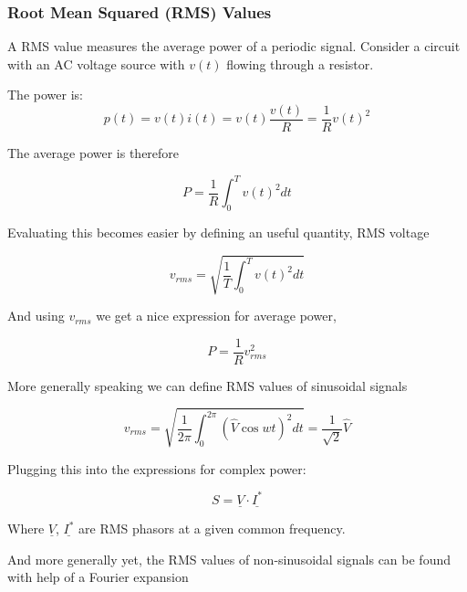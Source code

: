 \documentclass[../notes.tex]{subfiles}
\begin{document}
\subsubsection{Root Mean Squared (RMS) Values}


A RMS value measures the average power of a periodic signal. Consider a circuit with an AC voltage source with $ v(t) $ flowing through a resistor. 


The power is:
\begin{equation}
	p(t) = v(t) i(t) = v(t) \frac{v(t)}{R} = \frac{1}{R} v(t)^2
\end{equation}

The average power is therefore

\begin{equation}
	P = \frac{1}{R} \int_0^T v(t)^2 dt
\end{equation}


Evaluating this becomes easier by defining an useful quantity, RMS voltage

\begin{equation}
	v_{rms} = \sqrt{\frac{1}{T} \int^T_0 v(t)^2 dt} 
\end{equation}
	

And using $ v_{rms} $ we get a nice expression for average power,

\begin{equation}
	P = \frac{1}{R} v_{rms}^2
\end{equation}



More generally speaking we can define RMS values of sinusoidal signals

\begin{definition}
	\begin{equation}
		v_{rms} = \sqrt{\frac{1}{2\pi} \int^{2\pi}_0 (\hat{V} \cos wt )^2 dt}  = \frac{1}{\sqrt{2}}  \hat{V}
	\end{equation}
\end{definition}


Plugging this into the expressions for complex power:

\begin{equation}
	S = \underline{V} \cdot \underline{I^*}
\end{equation}

Where $ \underline{V} $, $ \underline{I^*} $ are RMS phasors at a given common frequency.


And more generally yet, the RMS values of non-sinusoidal signals can be found with help of a Fourier expansion
\end{document}

